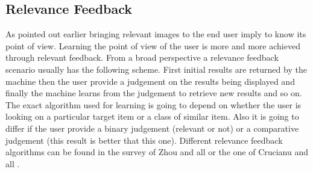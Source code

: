     \subsection{Relevance Feedback}

      As pointed out earlier bringing relevant images to the end user imply to know its point of view. Learning the point of view of the user is more and more achieved through relevant feedback. From a broad perspective a relevance feedback scenario usually has the following scheme. First initial results are returned by the machine then the user provide a judgement on the results being displayed and finally the machine learns from the judgement to retrieve new results and so on. The exact algorithm used for learning is going to depend on whether the user is looking on a particular target item or a class of similar item. Also it is going to differ if the user provide a binary judgement (relevant or not) or a comparative judgement (this result is better that this one). Different relevance feedback algorithms can be found in the survey of Zhou and all \cite{zhou2003relevance} or the one of Crucianu and all \cite{crucianu2004relevance}.
